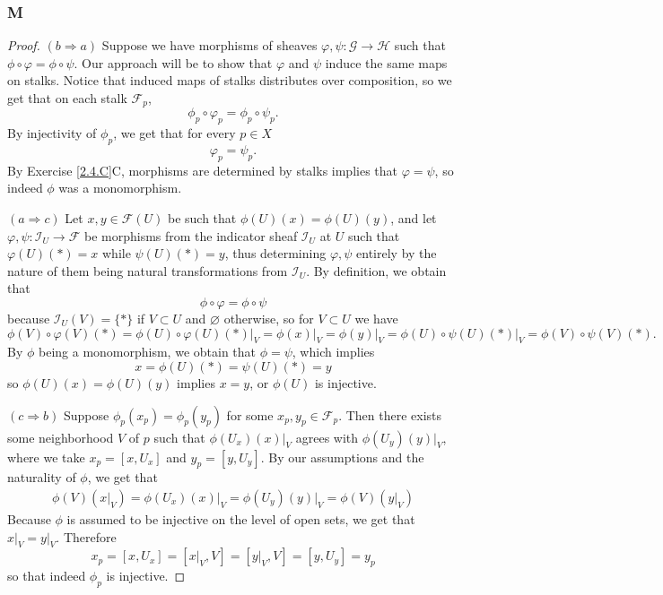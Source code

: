 \documentclass{article}
\newcommand{\fF}{\mathscr{F}}
\newcommand{\fG}{\mathscr{G}}
\newcommand{\fH}{\mathscr{H}}
\newcommand{\fI}{\mathscr{I}}
\let\emptyset\varnothing
\begin{document}
\subsubsection{M}\label{2.4.M}
\begin{proof}
    \item [$(b\Rightarrow a)$] Suppose we have morphisms of sheaves $\varphi,\psi:\fG\to \fH$ such that $\phi\circ \varphi=\phi\circ \psi$. Our approach will be to show that $\varphi$ and $\psi$ induce the same maps on stalks. Notice that induced maps of stalks distributes over composition, so we get that on each stalk $\fF_p$,
    \[
    \phi_p\circ \varphi_p=\phi_p\circ \psi_p.
    \]
    By injectivity of $\phi_p$, we get that for every $p\in X$
    \[
    \varphi_p=\psi_p.
    \]
    By Exercise \ref{2.4.C}C, morphisms are determined by stalks implies that $\varphi=\psi$, so indeed $\phi$ was a monomorphism.
    \item [$(a\Rightarrow c)$] 
    Let $x,y\in \fF(U)$ be such that $\phi(U)(x)=\phi(U)(y)$, and let $\varphi, \psi:\fI_U\to \fF$ be morphisms from the indicator sheaf $\fI_U$ at $U$ such that $\varphi(U)(*)=x$ while $\psi(U)(*)=y$, thus determining $\varphi,\psi$ entirely by the nature of them being natural transformations from $\fI_U$. By definition, we obtain that
    \[
    \phi\circ \varphi=\phi\circ \psi
    \]
    because $\fI_U(V)=\{*\}$ if $V\subset U$ and $\emptyset$ otherwise, so for $V\subset U$ we have
    \[
    \phi(V)\circ \varphi(V)(*)=\phi(U)\circ \varphi(U)(*)\vert_{V}=\phi(x)\vert_V=\phi(y)\vert_V=\phi(U)\circ \psi(U)(*)\vert_V=\phi(V)\circ \psi(V)(*).
    \]
    By $\phi$ being a monomorphism, we obtain that $\phi=\psi$, which implies \[
    x=\phi(U)(*)=\psi(U)(*)=y
    \]
    so $\phi(U)(x)=\phi(U)(y)$ implies $x=y$, or $\phi(U)$ is injective.
    \item [$(c\Rightarrow b)$]
    Suppose $\phi_p(x_p)=\phi_p(y_p)$ for some $x_p,y_p\in \fF_p$. Then there exists some neighborhood $V$ of $p$ such that $\phi(U_x)(x)\vert_V$ agrees with $\phi(U_y)(y)\vert_V$, where we take $x_p=[x,U_x]$ and $y_p=[y,U_y]$. By our assumptions and the naturality of $\phi$, we get that
    \begin{align*}
        \phi(V)(x\vert_V)=\phi(U_x)(x)\vert_V=\phi(U_y)(y)\vert_V=\phi(V)(y\vert_V)
    \end{align*}
    Because $\phi$ is assumed to be injective on the level of open sets, we get that $x\vert_V=y\vert_V$. Therefore
    \[
    x_p=[x,U_x]=[x\vert_V,V]=[y\vert_V,V]=[y,U_y]=y_p
    \]
    so that indeed $\phi_p$ is injective.
\end{proof}
\end{document}
